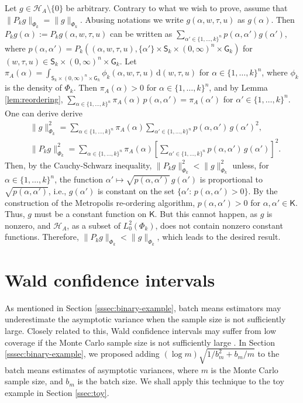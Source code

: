 \documentclass[12pt]{article}
\newcommand{\df}{\mathrm{d}}
\begin{document}
Let $g \in \mathcal{H}_A \setminus \{0\}$ be arbitrary.
Contrary to what we wish to prove, assume that $\|P_k g \|_{\Phi_k} = \|g\|_{\Phi_k}$.
Abusing notations we write $g(\alpha,w,\tau,u)$ as $g(\alpha)$.
Then $P_k g(\alpha) := P_k g(\alpha, w, \tau, u)$ can be written as $\sum_{\alpha' \in \{1,\dots,k\}^n} p(\alpha,\alpha') g(\alpha')$, where $p(\alpha,\alpha') = P_k((\alpha,w,\tau,u), \{\alpha'\} \times \mathsf{S}_k \times (0,\infty)^n \times \mathsf{G}_k)$ for $(w,\tau,u) \in  \mathsf{S}_k \times (0,\infty)^n \times \mathsf{G}_k$.
Let $\pi_A(\alpha) = \int_{\mathsf{S}_k \times (0,\infty)^n \times \mathsf{G}_k} \phi_k(\alpha,w,\tau,u) \, \df(w,\tau,u)$ for $\alpha \in \{1,\dots,k\}^n$, where $\phi_k$ is the density of $\Phi_k$.
Then $\pi_A(\alpha) > 0$ for $\alpha \in \{1,\dots,k\}^n$, and by Lemma \ref{lem:reordering}, $\sum_{\alpha \in \{1,\dots,k\}^n} \pi_A(\alpha) \, p(\alpha, \alpha') = \pi_A(\alpha')$ for $\alpha' \in \{1,\dots,k\}^n$.
One can derive derive
\[
\begin{aligned}
	& \|g\|_{\Phi_k}^2 = \sum_{\alpha \in \{1,\dots,k\}^n} \pi_A(\alpha) \sum_{\alpha' \in \{1,\dots,k\}^n} p(\alpha,\alpha') \, g(\alpha')^2, \\
	& \|P_k g\|_{\Phi_k}^2 = \sum_{\alpha \in \{1,\dots,k\}^n} \pi_A(\alpha) \left[ \sum_{\alpha' \in \{1,\dots,k\}^n} p(\alpha,\alpha') \, g(\alpha') \right]^2.
\end{aligned}
\]
Then, by the Cauchy-Schwarz inequality, $\|P_k g\|_{\Phi_k}^2 < \|g\|_{\Phi_k}^2$ unless, for $\alpha \in \{1,\dots,k\}^n$, the function $\alpha' \mapsto \sqrt{p(\alpha, \alpha') } \, g(\alpha')$ is proportional to $\sqrt{p(\alpha,\alpha')}$, i.e., $g(\alpha')$ is constant on the set $\{\alpha': \, p(\alpha,\alpha') > 0\}$.
By the construction of the Metropolis re-ordering algorithm, $p(\alpha,\alpha') > 0$ for $\alpha, \alpha' \in \mathsf{K}$.
Thus, $g$ must be a constant function on $\mathsf{K}$.
But this cannot happen, as $g$ is nonzero, and $\mathcal{H}_A$, as a subset of $L_0^2(\Phi_k)$, does not contain nonzero constant functions.
Therefore, $\|P_k g \|_{\Phi_k} < \|g\|_{\Phi_k}$, which leads to the desired result.

{
\section{Wald confidence intervals} \label{app:wald}
}

As mentioned in Section \ref{sssec:binary-example}, batch means estimators may underestimate the asymptotic variance when the sample size is not sufficiently large.
Closely related to this, Wald confidence intervals may suffer from low coverage if the Monte Carlo sample size is not sufficiently large \citep{flegal2010batch,vollset1993confidence}.
In Section \ref{sssec:binary-example}, we proposed adding $(\log m) \sqrt{1/b_m^2 + b_m/m}$ to the batch means estimates of asymptotic variances, where $m$ is the Monte Carlo sample size, and $b_m$ is the batch size.
We shall apply this technique to the toy example in Section \ref{ssec:toy}.
\end{document}
